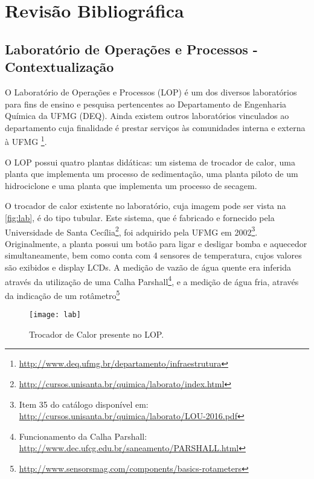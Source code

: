 \chapter{Revisão Bibliográfica}
	
	\section{Laboratório de Operações e Processos - Contextualização}
		\label{sec:trocador}
		O Laboratório de Operações e Processos (LOP) é um dos diversos laboratórios para fins de ensino e pesquisa pertencentes ao Departamento de Engenharia Química da UFMG (DEQ). Ainda existem outros laboratórios vinculados ao departamento cuja finalidade é prestar serviços às comunidades interna e externa à UFMG \footnote{\url{http://www.deq.ufmg.br/departamento/infraestrutura}}.
		
		O LOP possui quatro plantas didáticas: um sistema de trocador de calor, uma planta que implementa um processo de sedimentação, uma planta piloto de um hidrociclone e uma planta que implementa um processo de secagem.
		
		O trocador de calor existente no laboratório, cuja imagem pode ser vista na \autoref{fig:lab}, é do tipo tubular. Este sistema, que é fabricado e fornecido pela Universidade de Santa Cecília\footnote{\url{http://cursos.unisanta.br/quimica/laborato/index.html}}, foi adquirido pela UFMG em 2002\footnote{Item 35 do catálogo disponível em: \url{http://cursos.unisanta.br/quimica/laborato/LOU-2016.pdf}}. Originalmente, a planta possui um botão para ligar e desligar bomba e aquecedor simultaneamente, bem como conta com 4 sensores de temperatura, cujos valores são exibidos e display LCDs. A medição de vazão de água quente era inferida através da utilização de uma Calha Parshall\footnote{Funcionamento da Calha Parshall: \url{http://www.dec.ufcg.edu.br/saneamento/PARSHALL.html}}, e a medição de água fria, através da indicação de um rotâmetro\footnote{\url{http://www.sensorsmag.com/components/basics-rotameters}}
		
		\begin{figure}[!htb]
			\centering
			\texttt{[image: lab]}  %
			\caption{Trocador de Calor presente no LOP.}
			\label{fig:lab}
		\end{figure}

